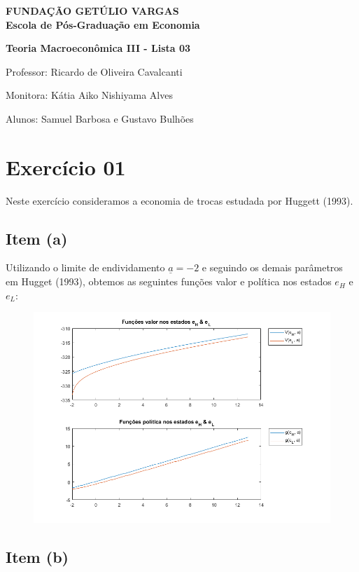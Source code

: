 \documentclass{article}
\begin{document}
\begin{flushleft}
\textbf{FUNDAÇÃO GETÚLIO VARGAS} \\

\textbf{Escola de Pós-Graduação em Economia}

\textbf{Teoria Macroeconômica III - Lista 03}

Professor: Ricardo de Oliveira Cavalcanti

Monitora: Kátia Aiko Nishiyama Alves

Alunos: Samuel Barbosa e Gustavo Bulhões
\end{flushleft}

\section*{Exercício 01}
Neste exercício consideramos a economia de trocas estudada por Huggett (1993).

\subsection*{Item (a)}
Utilizando o limite de endividamento $\underline{a} = -2$ e seguindo os demais parâmetros em
Hugget (1993), obtemos as seguintes funções valor e política nos estados $e_H$ e $e_L$:

\begin{figure}[!h]
  \includegraphics[scale=0.6]{ex1/ex1_1.png}
\end{figure}

\subsection*{Item (b)}
\end{document}
